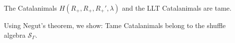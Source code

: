\documentclass[dvipsnames]{beamer}
\newcommand{\Scal}{\mathcal{S}}
\theoremstyle{definition}
\begin{document}
\begin{frame}
The Catalanimals $H(R_+,R_+, R_+',\lambda)$ and the LLT Catalanimals
are tame.

\vspace{2mm}

Using Negut's theorem, we show:
Tame Catalanimals belong to the shuffle algebra  $\Scal_\Gamma$.
\vspace{1mm}
\end{frame}
\end{document}
